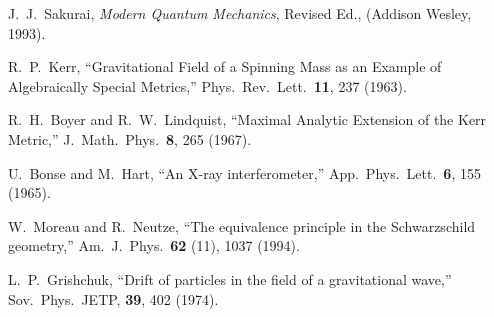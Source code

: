 \documentclass[twocolumn,reprint,amsmath,amssymb]{revtex4}
\begin{document}
\begin{thebibliography}{}
J.\ J.\ Sakurai, {\it Modern Quantum Mechanics}, Revised Ed., (Addison Wesley, 1993).

R.\ P.\ Kerr,
``Gravitational Field of a Spinning Mass as an Example of Algebraically Special Metrics,''
Phys.\ Rev.\ Lett.\ {\bf 11}, 237 (1963).

R.\ H.\ Boyer and R.\ W.\ Lindquist,
``Maximal Analytic Extension of the Kerr Metric,''
J.\ Math.\ Phys.\ {\bf 8}, 265 (1967).

U.\ Bonse and M.\ Hart, 
``An X-ray interferometer,''
App.\ Phys.\ Lett.\ {\bf 6}, 155 (1965).

W.\ Moreau and R.\ Neutze, 
``The equivalence principle in the Schwarzschild geometry,''
Am.\ J.\ Phys.\ {\bf 62} (11), 1037 (1994).

L.\ P.\ Grishchuk, 
``Drift of particles in the field of a gravitational wave,''
Sov.\ Phys.\ JETP, {\bf 39}, 402 (1974).



%

\end{thebibliography}
\end{document}
